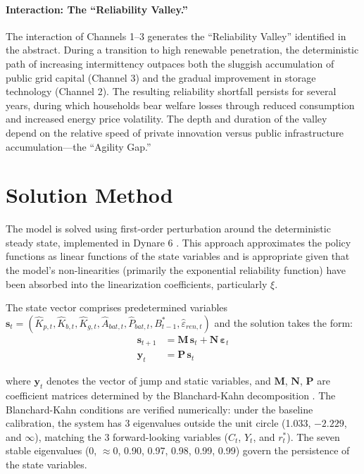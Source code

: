\documentclass[12pt, a4paper]{article}
\begin{document}
\paragraph{Interaction: The ``Reliability Valley.''}
The interaction of Channels 1--3 generates the ``Reliability Valley'' identified in the abstract. During a transition to high renewable penetration, the deterministic path of increasing intermittency outpaces both the sluggish accumulation of public grid capital (Channel 3) and the gradual improvement in storage technology (Channel 2). The resulting reliability shortfall persists for several years, during which households bear welfare losses through reduced consumption and increased energy price volatility. The depth and duration of the valley depend on the relative speed of private innovation versus public infrastructure accumulation---the ``Agility Gap.''

\section{Solution Method} \label{sec:solution}

The model is solved using first-order perturbation around the deterministic steady state, implemented in Dynare 6 \citep{Adjemianetal2024}. This approach approximates the policy functions as linear functions of the state variables and is appropriate given that the model's non-linearities (primarily the exponential reliability function) have been absorbed into the linearization coefficients, particularly $\xi$.

The state vector comprises predetermined variables $\mathbf{s}_t = (\hat{K}_{p,t}, \hat{K}_{b,t}, \hat{K}_{g,t}, \hat{A}_{bat,t}, \hat{P}_{bat,t}, B^*_{t-1}, \hat{\varepsilon}_{ren,t})$ and the solution takes the form:
\begin{align}
\mathbf{s}_{t+1} &= \mathbf{M} \, \mathbf{s}_t + \mathbf{N} \, \boldsymbol{\varepsilon}_t \\
\mathbf{y}_t &= \mathbf{P} \, \mathbf{s}_t
\end{align}

where $\mathbf{y}_t$ denotes the vector of jump and static variables, and $\mathbf{M}$, $\mathbf{N}$, $\mathbf{P}$ are coefficient matrices determined by the Blanchard-Kahn decomposition \citep{blanchard1980}. The Blanchard-Kahn conditions are verified numerically: under the baseline calibration, the system has 3 eigenvalues outside the unit circle (1.033, $-2.229$, and $\infty$), matching the 3 forward-looking variables ($C_t$, $Y_t$, and $r^*_t$). The seven stable eigenvalues (0, $\approx$0, 0.90, 0.97, 0.98, 0.99, 0.99) govern the persistence of the state variables.
\end{document}
